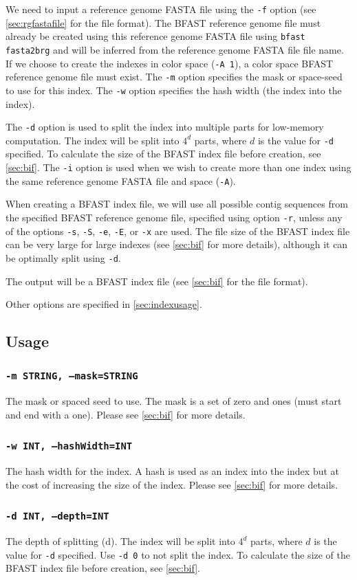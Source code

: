 \documentclass[a4paper,12pt]{book}
\newcommand{\TT}[1]{{\tt #1}} %
\newcommand{\rGFF}{reference genome FASTA file}
\newcommand{\BRGF}{BFAST reference genome file} %
\newcommand{\BIF}{BFAST index file} %
\begin{document}
We need to input a \rGFF{} using the \TT{-f} option (see \autoref{sec:rgfastafile} for the file format).
The \BRGF{} must already be created using this \rGFF{} using \TT{bfast fasta2brg} and will be inferred from the \rGFF{} file name.
If we choose to create the indexes in color space (\TT{-A 1}), a color space \BRGF{} must exist.
The \TT{-m} option specifies the mask or space-seed to use for this index.
The \TT{-w} option specifies the hash width (the index into the index).

The \TT{-d} option is used to split the index into multiple parts for low-memory computation.
The index will be split into $4^d$ parts, where $d$ is the value for \TT{-d} specified.
To calculate the size of the \BIF{} before creation, see \autoref{sec:bif}.
The \TT{-i} option is used when we wish to create more than one index using the same \rGFF{} and space (\TT{-A}).

When creating a \BIF{}, we will use all possible contig sequences from the specified \BRGF{}, specified using option \TT{-r}, unless any of the options \TT{-s}, \TT{-S}, \TT{-e}, \TT{-E}, or \TT{-x} are used.
The file size of the \BIF{} can be very large for large indexes (see \autoref{sec:bif} for more details), although it can be optimally split using \TT{-d}.

The output will be a \BIF{} (see \autoref{sec:bif} for the file format).

Other options are specified in \autoref{sec:indexusage}.
\subsection{Usage}
\label{sec:indexusage}

\subsubsection{\TT{-m STRING, --mask=STRING}}
The mask or spaced seed to use.
The mask is a set of zero and ones (must start and end with a one).
Please see \autoref{sec:bif} for more details.

\subsubsection{\TT{-w INT, --hashWidth=INT}}
The hash width for the index.
A hash is used as an index into the index but at the cost of increasing the size of the index.
Please see \autoref{sec:bif} for more details.

\subsubsection{\TT{-d INT, --depth=INT}}
The depth of splitting (d).  
The index will be split into $4^d$ parts, where $d$ is the value for \TT{-d} specified.
Use \TT{-d 0} to not split the index.
To calculate the size of the \BIF{} before creation, see \autoref{sec:bif}.
\end{document}
